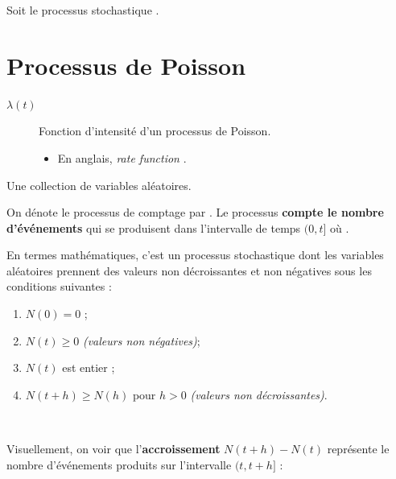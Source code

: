\documentclass[french]{article}
\begin{document}
\begin{multicols*}{2}
\begin{definitionNOHFILL}
Soit le processus stochastique .
\end{definitionNOHFILL}


\columnbreak
\section{Processus de Poisson}
\label{sec:procPois}
\begin{distributions}[Notation]
\begin{description}
	\item[$\lambda(t)$]	Fonction d'intensité d'un processus de Poisson.
		\begin{itemize}
		\item	En anglais, \og \textit{rate function} \fg{}.
		\end{itemize}
\end{description}
\end{distributions}
\begin{definitionNOHFILL}
Une collection de variables aléatoires.
\end{definitionNOHFILL}

\begin{definitionNOHFILLsub}
On dénote le processus de comptage par . Le processus \textbf{compte le nombre d'événements} qui se produisent dans l'intervalle de temps $(0, t]$ où .

\bigskip

En termes mathématiques, c'est un processus stochastique dont les variables aléatoires prennent des valeurs non décroissantes et non négatives sous les conditions suivantes :
\begin{enumerate}
	\item	$N(0) = 0$ ;
	\item	$N(t) \geq 0$ \textit{(valeurs non négatives)};
	\item	$N(t)$ est entier ;
	\item	$N(t + h) \geq N(h)$ pour $h	>	0$ \textit{(valeurs non décroissantes)}.
\end{enumerate}

\

Visuellement, on voir que l'\textbf{accroissement} $N(t + h) - N(t)$ représente le nombre d'événements produits sur l'intervalle $(t, t + h]$ :
\begin{center}
\begin{tikzpicture}[x=0.75pt,y=0.75pt,yscale=-1,xscale=1]


\end{tikzpicture}
\end{center}
\end{definitionNOHFILLsub}
\end{multicols*}
\end{document}
